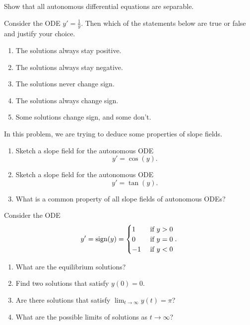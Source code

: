 \newpage

\begin{exercises}

	\begin{problist}
	\prob Show that all autonomous differential equations are separable.
	
	\prob Consider the ODE $y'=\displaystyle \frac1y$.
	Then which of the statements below are true or false and justify your choice.
	\begin{enumerate}
		\item The solutions always stay positive.
		\item The solutions always stay negative.
		\item The solutions never change sign.
		\item The solutions always change sign.
		\item Some solutions change sign, and some don't.
	\end{enumerate}
	
	\prob In this problem, we are trying to deduce some properties of slope fields.
	\begin{enumerate}
		\item Sketch a slope field for the autonomous ODE $$y'=\cos(y).$$
		\item Sketch a slope field for the autonomous ODE $$y'=\tan(y).$$
		\item What is a common property of all slope fields of autonomous ODEs?
	\end{enumerate}	
	
	\prob Consider the ODE
	$$ 
	y' = {\rm sign}(y) = 
		\begin{cases}
			1 & \text{ if } y > 0 \\	
			0 & \text{ if } y = 0 \\	
			-1 & \text{ if } y < 0
		\end{cases}. 
	$$

	\begin{enumerate}
		\item What are the equilibrium solutions?
		\item Find two solutions that satisfy $y(0)=0$.
		\item Are there solutions that satisfy $\displaystyle \lim_{t \to \infty} y(t) = \pi$?
		\item What are the possible limits of solutions as $t\to \infty$?
	\end{enumerate}
	





\end{problist}
\end{exercises}
